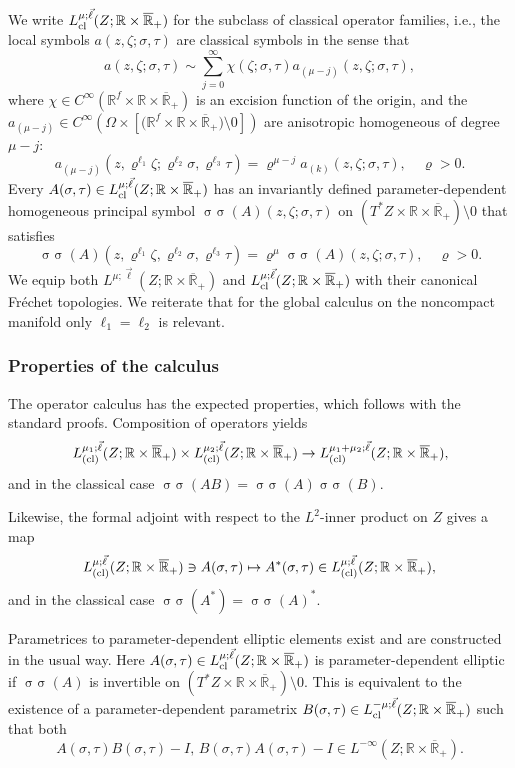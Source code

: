 \documentclass[reqno]{amsart}
\numberwithin{equation}{section}
\theoremstyle{definition}
\def\R{\mathbb R}
\DeclareMathOperator{\sym}{ \sigma\!\!\!\sigma}
\begin{document}
We write $L_{\textup{cl}}^{\mu;\vec{\ell}}(Z;\R\times\overline{\R}_{+})$ for the subclass of classical operator families, i.e., the local symbols $a(z,\zeta;\sigma,\tau)$ are classical symbols in the sense that
$$
a(z,\zeta;\sigma,\tau) \sim \sum\limits_{j=0}^{\infty}\chi(\zeta;\sigma,\tau)a_{(\mu-j)}(z,\zeta;\sigma,\tau),
$$
where $\chi \in C^{\infty}(\R^f\times\R\times\overline{\R}_{+})$ is an excision function of the origin, and the $a_{(\mu-j)} \in C^{\infty}(\Omega\times[\bigl(\R^f
\times\R\times\overline{\R}_{+}\bigr)\setminus 0])$ are anisotropic homogeneous of degree $\mu-j$:
$$
a_{(\mu-j)}(z,\varrho^{\ell_1}\zeta;\varrho^{\ell_2}\sigma,\varrho^{\ell_3}\tau) = \varrho^{\mu-j}a_{(k)}(z,\zeta;\sigma,\tau), \quad \varrho > 0.
$$
Every $A(\sigma,\tau) \in L_{\textup{cl}}^{\mu;\vec{\ell}}(Z;\R\times\overline{\R}_{+})$ has an invariantly defined parameter-dependent homogeneous principal symbol
$\sym(A)(z,\zeta;\sigma,\tau)$ on $(T^*Z\times\R\times\overline{\R}_{+})\setminus 0$ that satisfies
$$
\sym(A)(z,\varrho^{\ell_1}\zeta,\varrho^{\ell_2}\sigma,\varrho^{\ell_3}\tau) = \varrho^{\mu}\sym(A)(z,\zeta;\sigma,\tau), \quad \varrho > 0.
$$
We equip both $L^{\mu;\vec{\ell}}(Z;\R\times\overline{\R}_{+})$ and $L_{\textup{cl}}^{\mu;\vec{\ell}}(Z;\R\times\overline{\R}_{+})$ with their canonical Fr{\'e}chet topologies. We reiterate that for the global calculus on the noncompact manifold only $\ell_1=\ell_2$ is relevant.

\subsubsection*{Properties of the calculus}

The operator calculus has the expected properties, which follows with the standard proofs. Composition of operators yields
$$
L_{\textup{(cl)}}^{\mu_1;\vec{\ell}}(Z;\R\times\overline{\R}_{+}) \times L_{\textup{(cl)}}^{\mu_2;\vec{\ell}}(Z;\R\times\overline{\R}_{+}) \to L_{\textup{(cl)}}^{\mu_1+\mu_2;\vec{\ell}}(Z;\R\times\overline{\R}_{+}),
$$
and in the classical case $\sym(AB) = \sym(A)\sym(B)$.

Likewise, the formal adjoint with respect to the $L^2$-inner product on $Z$ gives a map
$$
L_{\textup{(cl)}}^{\mu;\vec{\ell}}(Z;\R\times\overline{\R}_{+}) \ni A(\sigma,\tau) \mapsto A^*(\sigma,\tau) \in L_{\textup{(cl)}}^{\mu;\vec{\ell}}(Z;\R\times\overline{\R}_{+}),
$$
and in the classical case $\sym(A^*) = \sym(A)^*$.

Parametrices to parameter-dependent elliptic elements exist and are constructed in the usual way. Here $A(\sigma,\tau) \in L_{\textup{cl}}^{\mu;\vec{\ell}}(Z;\R\times\overline{\R}_{+})$ is parameter-dependent elliptic if $\sym(A)$ is invertible on $(T^*Z\times\R\times\overline{\R}_{+})\setminus 0$. This is equivalent to the existence of a parameter-dependent parametrix $B(\sigma,\tau) \in L_{\textup{cl}}^{-\mu;\vec{\ell}}(Z;\R\times\overline{\R}_{+})$ such that both
$$
A(\sigma,\tau)B(\sigma,\tau) - I,\, B(\sigma,\tau)A(\sigma,\tau) - I \in L^{-\infty}(Z;\R\times\overline{\R}_{+}).
$$
\end{document}
